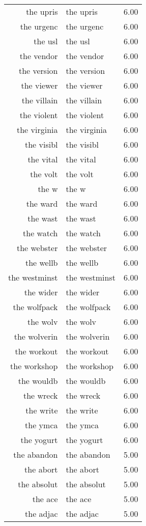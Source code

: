 \begin{table}[ht]
\begin{tabular}{rlr}
  the upris & the upris & 6.00 \\ 
  the urgenc & the urgenc & 6.00 \\ 
  the usl & the usl & 6.00 \\ 
  the vendor & the vendor & 6.00 \\ 
  the version & the version & 6.00 \\ 
  the viewer & the viewer & 6.00 \\ 
  the villain & the villain & 6.00 \\ 
  the violent & the violent & 6.00 \\ 
  the virginia & the virginia & 6.00 \\ 
  the visibl & the visibl & 6.00 \\ 
  the vital & the vital & 6.00 \\ 
  the volt & the volt & 6.00 \\ 
  the w & the w & 6.00 \\ 
  the ward & the ward & 6.00 \\ 
  the wast & the wast & 6.00 \\ 
  the watch & the watch & 6.00 \\ 
  the webster & the webster & 6.00 \\ 
  the wellb & the wellb & 6.00 \\ 
  the westminst & the westminst & 6.00 \\ 
  the wider & the wider & 6.00 \\ 
  the wolfpack & the wolfpack & 6.00 \\ 
  the wolv & the wolv & 6.00 \\ 
  the wolverin & the wolverin & 6.00 \\ 
  the workout & the workout & 6.00 \\ 
  the workshop & the workshop & 6.00 \\ 
  the wouldb & the wouldb & 6.00 \\ 
  the wreck & the wreck & 6.00 \\ 
  the write & the write & 6.00 \\ 
  the ymca & the ymca & 6.00 \\ 
  the yogurt & the yogurt & 6.00 \\ 
  the abandon & the abandon & 5.00 \\ 
  the abort & the abort & 5.00 \\ 
  the absolut & the absolut & 5.00 \\ 
  the ace & the ace & 5.00 \\ 
  the adjac & the adjac & 5.00 \\ 

\end{tabular}
\end{table}
